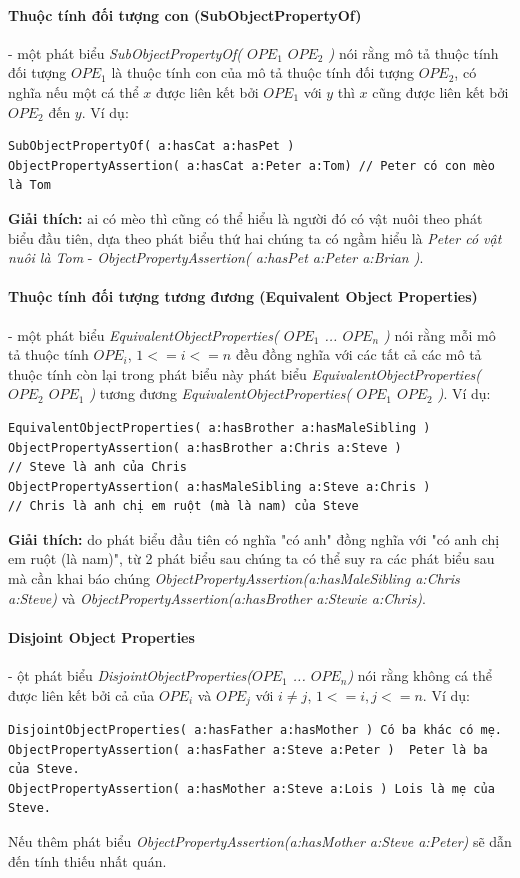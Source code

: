\paragraph{Thuộc tính đối tượng con (SubObjectPropertyOf)} - một phát biểu \textit{SubObjectPropertyOf( $OPE_{1}$ $OPE_{2}$ )} nói rằng mô tả thuộc tính đối tượng $OPE_{1}$ là thuộc tính con của mô tả thuộc tính đối tượng $OPE_{2}$, có nghĩa nếu một cá thể $x$ được liên kết bởi $OPE_{1}$ với $y$ thì $x$ cũng được liên kết bởi $OPE_{2}$ đến $y$. Ví dụ:
\begin{verbatim}
SubObjectPropertyOf( a:hasCat a:hasPet )     
ObjectPropertyAssertion( a:hasCat a:Peter a:Tom) // Peter có con mèo là Tom
\end{verbatim}
\textbf{Giải thích:} ai có mèo thì cũng có thể hiểu là người đó có vật nuôi theo phát biểu đầu tiên, dựa theo phát biểu thứ hai chúng ta có ngầm hiểu là \textit{Peter có vật nuôi là Tom} - \textit{ObjectPropertyAssertion( a:hasPet a:Peter a:Brian )}.

\paragraph{Thuộc tính đối tượng tương đương (Equivalent Object Properties)} - một phát biểu \textit{EquivalentObjectProperties( $OPE_{1}$ ... $OPE_{n}$ )} nói rằng mỗi mô tả thuộc tính $OPE_{i}$, $1<=i<=n$ đều đồng nghĩa với các tất cả các mô tả thuộc tính còn lại trong phát biểu này phát biểu \textit{EquivalentObjectProperties( $OPE_{2}$ $OPE_{1}$ )} tương đương \textit{EquivalentObjectProperties( $OPE_{1}$ $OPE_{2}$ )}. Ví dụ:
\begin{verbatim}
EquivalentObjectProperties( a:hasBrother a:hasMaleSibling ) 
ObjectPropertyAssertion( a:hasBrother a:Chris a:Steve )     
// Steve là anh của Chris
ObjectPropertyAssertion( a:hasMaleSibling a:Steve a:Chris ) 
// Chris là anh chị em ruột (mà là nam) của Steve
\end{verbatim}
\textbf{Giải thích:} do phát biểu đầu tiên có nghĩa "có anh" đồng nghĩa với "có anh chị em ruột (là nam)", từ 2 phát biểu sau chúng ta có thể suy ra các phát biểu sau mà cần khai báo chúng \textit{ObjectPropertyAssertion(a:hasMaleSibling a:Chris a:Steve)} và \textit{ObjectPropertyAssertion(a:hasBrother a:Stewie a:Chris)}.

\paragraph{Disjoint Object Properties} - ột phát biểu \textit{DisjointObjectProperties($OPE_{1}$ ... $OPE_{n}$)} nói rằng không cá thể được liên kết bởi cả của $OPE_{i}$ và $OPE_{j}$ với $i \neq j$, $1<=i,j<=n$. Ví dụ:
\begin{verbatim}
DisjointObjectProperties( a:hasFather a:hasMother ) Có ba khác có mẹ.
ObjectPropertyAssertion( a:hasFather a:Steve a:Peter )	Peter là ba của Steve.
ObjectPropertyAssertion( a:hasMother a:Steve a:Lois ) Lois là mẹ của Steve.
\end{verbatim}
Nếu thêm phát biểu \textit{ObjectPropertyAssertion(a:hasMother a:Steve a:Peter)} sẽ dẫn đến tính thiếu nhất quán.

